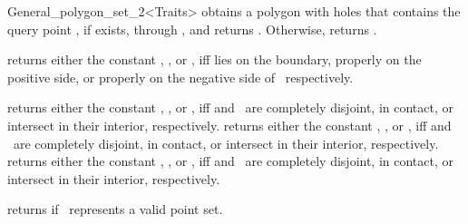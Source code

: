 \begin{ccRefClass}{General_polygon_set_2<Traits>}
  {obtains a polygon with holes that contains the query point , 
   if exists, through , and returns . 
   Otherwise, returns .}

  {returns either the constant , 
   , or , iff  lies on 
   the boundary, properly on the positive side, or properly on the negative 
   side of \ccVar\ respectively.}

  {returns either the constant ,
   , or , iff 
    and \ccVar\ are completely disjoint, in contact, or
   intersect in their interior, respectively.}
\ccGlue
{}
  {returns either the constant ,
   , or , iff 
    and \ccVar\ are completely disjoint, in contact, or
   intersect in their interior, respectively.}
\ccGlue
{}
  {returns either the constant ,
   , or , iff 
    and \ccVar\ are completely disjoint, in contact, or
   intersect in their interior, respectively.}


  {returns  if \ccVar\ represents a valid point set.}

\ccSeeAlso
  \\
  \\

\end{ccRefClass}

\ccRefPageEnd
